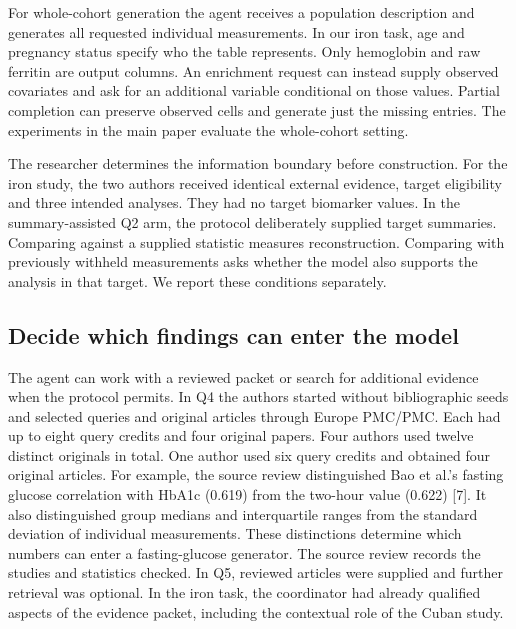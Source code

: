 \documentclass[11pt,letterpaper]{article}
\begin{document}
For whole-cohort generation the agent receives a population description and generates all requested individual measurements. In our iron task, age and pregnancy status specify who the table represents. Only hemoglobin and raw ferritin are output columns. An enrichment request can instead supply observed covariates and ask for an additional variable conditional on those values. Partial completion can preserve observed cells and generate just the missing entries. The experiments in the main paper evaluate the whole-cohort setting.


The researcher determines the information boundary before construction. For the iron study, the two authors received identical external evidence, target eligibility and three intended analyses. They had no target biomarker values. In the summary-assisted Q2 arm, the protocol deliberately supplied target summaries. Comparing against a supplied statistic measures reconstruction. Comparing with previously withheld measurements asks whether the model also supports the analysis in that target. We report these conditions separately.


\subsection{Decide which findings can enter the model}

The agent can work with a reviewed packet or search for additional evidence when the protocol permits. In Q4 the authors started without bibliographic seeds and selected queries and original articles through Europe PMC/\allowbreak{}PMC. Each had up to eight query credits and four original papers. Four authors used twelve distinct originals in total. One author used six query credits and obtained four original articles. For example, the source review distinguished Bao et al.'s fasting glucose correlation with HbA1c (0.619) from the two-hour value (0.622) [7]. It also distinguished group medians and interquartile ranges from the standard deviation of individual measurements. These distinctions determine which numbers can enter a fasting-glucose generator. The source review records the studies and statistics checked. In Q5, reviewed articles were supplied and further retrieval was optional. In the iron task, the coordinator had already qualified aspects of the evidence packet, including the contextual role of the Cuban study.


\FloatBarrier

\begingroup

\small
\end{document}
